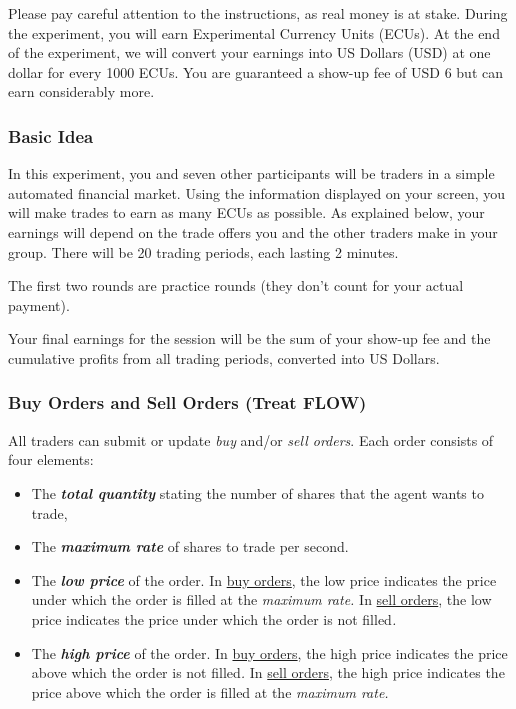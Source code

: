 \documentclass[12pt]{article}
\begin{document}
\begin{singlespace}
Please pay careful attention to the instructions, as real money is at
stake. During the experiment, you will earn Experimental Currency Units
(ECUs). At the end of the experiment, we will convert your earnings into
US Dollars (USD) at one dollar for every 1000 ECUs. You are guaranteed a
show-up fee of USD 6 but can earn considerably more.

\subsubsection*{Basic Idea}\label{basic-idea_flow}

In this experiment, you and seven other participants will be traders in
a simple automated financial market. Using the information displayed on
your screen, you will make trades to earn as many ECUs as possible. As
explained below, your earnings will depend on the trade offers you and
the other traders make in your group. There will be 20 trading periods,
each lasting 2 minutes.

The first two rounds are practice rounds (they don't count for your actual payment).

Your final earnings for the session will be the sum of your show-up fee
and the cumulative profits from all trading periods, converted into US
Dollars.

\subsubsection*{Buy Orders and Sell Orders (Treat
FLOW)}\label{buy-orders-and-sell-orders-treat-flow}

All traders can submit or update \emph{buy} and/or \emph{sell orders}.
Each order consists of four elements:

\begin{itemize}
\item
  The \emph{\textbf{total quantity}} stating the number of shares that
  the agent wants to trade,
\item
  The \emph{\textbf{maximum rate}} of shares to trade per second.
\item
  The \emph{\textbf{low price}} of the order. In \ul{buy orders}, the
  low price indicates the price under which the order is filled at the
  \emph{maximum rate.} In \ul{sell orders}, the low price indicates the
  price under which the order is not filled\emph{.}
\item
  The \emph{\textbf{high price}} of the order. In \ul{buy orders}, the
  high price indicates the price above which the order is not
  filled\emph{.} In \ul{sell orders}, the high price indicates the price
  above which the order is filled at the \emph{maximum rate.}
\end{itemize}


\end{singlespace}
\end{document}
